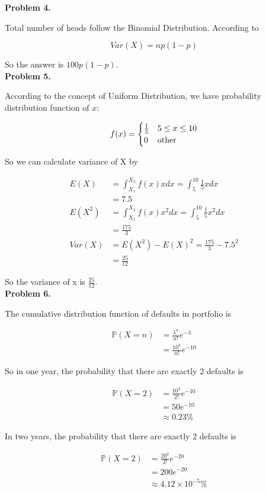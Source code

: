 \documentclass[12pt,a4paper]{article}
\begin{document}
\textbf{Problem 4.}

Total number of heads follow the Binomial Distribution. According to

\[
Var(X) = np(1-p)
\]

So the answer is $100p(1-p)$.
\\

\textbf{Problem 5.}

According to the concept of Uniform Distribution, we have probability distribution function of $x$:

\[
f(x)=
\begin{cases}

\frac{1}{5}       & 5\leq x \leq10 \\
0  &  \rm{other} 

\end{cases}
\]

So we can calculate variance of X by

\[
\begin{aligned}
E(X) &= \int_{X_1}^{X_2}f(x)x dx = \int_{5}^{10}\frac{1}{5}x dx\\
&=7.5\\
E(X^2) &= \int_{X_1}^{X_2}f(x)x^2 dx = \int_{5}^{10}\frac{1}{5}x^2 dx\\
&=\frac{175}{3}\\
Var(X) &= E(X^2) - E(X)^2 = \frac{175}{3} - 7.5^2\\
&=\frac{25}{12}
\end{aligned}
\]

So the variance of x is $\frac{25}{12}$.
\\

\textbf{Problem 6.}

The cumulative distribution function of defaults in portfolio is 

\[
\begin{aligned}
\mathbb{P}(X = n) &= \frac{\lambda^n}{n!}e^{-\lambda}\\
&=\frac{10^n}{n!}e^{-10}
\end{aligned}
\]

So in one year, the probability that there are exactly 2 defaults is 

\[
\begin{aligned}
\mathbb{P}(X = 2) &= \frac{10^2}{2!}e^{-10}\\
&= 50e^{-10}\\
&\approx 0.23 \%
\end{aligned}
\]

In two years, the probability that there are exactly 2 defaults is 

\[
\begin{aligned}
\mathbb{P}(X = 2) &= \frac{20^2}{2!}e^{-20}\\
&= 200e^{-20}\\
&\approx 4.12\times 10^{-5} \%
\end{aligned}
\]
\end{document}
